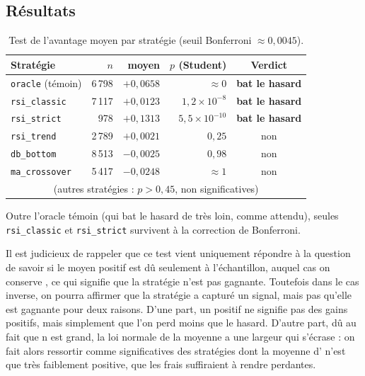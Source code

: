 \subsection{Résultats}
\begin{table}[H]
\centering
\caption{Test de l'avantage moyen par stratégie (seuil Bonferroni $\approx 0{,}0045$).}
\label{tab:b1-etape1}
\small
\begin{tabular}{@{}lrrrc@{}}
\toprule
Stratégie & $n$ & \edgevar{} moyen & $p$ (Student) & Verdict \\
\midrule
\texttt{oracle} (témoin) & 6\,798 & $+0{,}0658$ & $\approx 0$    & \textbf{bat le hasard} \\
\midrule
\texttt{rsi\_classic} & 7\,117 & $+0{,}0123$ & $1{,}2\times10^{-8}$  & \textbf{bat le hasard} \\
\texttt{rsi\_strict}  &   978  & $+0{,}1313$ & $5{,}5\times10^{-10}$ & \textbf{bat le hasard} \\
\texttt{rsi\_trend}   & 2\,789 & $+0{,}0021$ & $0{,}25$             & non \\
\texttt{db\_bottom}   & 8\,513 & $-0{,}0025$ & $0{,}98$             & non \\
\texttt{ma\_crossover}& 5\,417 & $-0{,}0248$ & $\approx 1$          & non \\
\multicolumn{5}{c}{\footnotesize (autres stratégies : $p>0{,}45$, non significatives)} \\
\bottomrule
\end{tabular}
\end{table}

Outre l'oracle témoin (qui bat le hasard de très loin, comme attendu),
seules \texttt{rsi\_classic} et \texttt{rsi\_strict} survivent à la
correction de Bonferroni.

Il est judicieux de rappeler que ce test vient uniquement répondre à la question de savoir 
si le \edgevar{} moyen positif est dû seulement à l'échantillon, auquel cas on conserve \Hzero{}, ce qui
signifie que la stratégie n'est pas gagnante.
Toutefois dans le cas inverse, on pourra affirmer que la stratégie a capturé un signal,
mais pas qu'elle est gagnante pour deux raisons. 
D'une part, un \edgevar{} positif ne signifie pas des gains positifs, mais simplement que l'on perd moins que le hasard. 
D'autre part, dû au fait que n est grand, la loi normale de la moyenne a une largeur qui s'écrase : 
on fait alors ressortir comme significatives des stratégies dont la moyenne
d'\edgevar{} n'est que très
faiblement positive, que les frais suffiraient à rendre perdantes.

